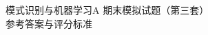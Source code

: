 
\geometry{left=2.4cm,right=2.4cm}
\renewcommand{\coursename}{模式识别与机器学习A\quad 期末模拟试题（第三套）参考答案与评分标准}
\fancyfootoffset[L]{0pt}

\begin{center}
{\LARGE\heiti 模式识别与机器学习A 期末模拟试题（第三套）}\\[4pt]
{\Large\heiti 参考答案与评分标准}
\end{center}


